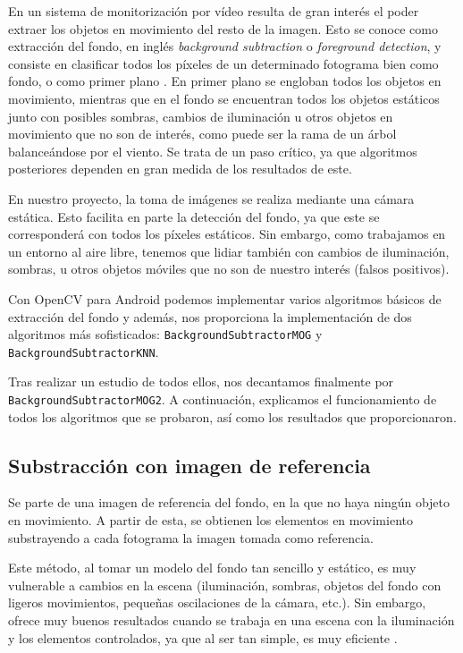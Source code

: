En un sistema de monitorización por vídeo resulta de gran interés el
poder extraer los objetos en movimiento del resto de la imagen. Esto se
conoce como extracción del fondo, en inglés \emph{background
subtraction} o \emph{foreground detection}, y consiste en clasificar
todos los píxeles de un determinado fotograma bien como fondo, o como
primer plano \citep{wiki:bs}. En primer plano se engloban todos los
objetos en movimiento, mientras que en el fondo se encuentran todos los
objetos estáticos junto con posibles sombras, cambios de iluminación u
otros objetos en movimiento que no son de interés, como puede ser la
rama de un árbol balanceándose por el viento. Se trata de un paso
crítico, ya que algoritmos posteriores dependen en gran medida de los
resultados de este.

En nuestro proyecto, la toma de imágenes se realiza mediante una cámara
estática. Esto facilita en parte la detección del fondo, ya que este se
corresponderá con todos los píxeles estáticos. Sin embargo, como
trabajamos en un entorno al aire libre, tenemos que lidiar también con
cambios de iluminación, sombras, u otros objetos móviles que no son de
nuestro interés (falsos positivos).

Con OpenCV para Android podemos implementar varios algoritmos básicos de
extracción del fondo y además, nos proporciona la implementación de dos
algoritmos más sofisticados: \texttt{BackgroundSubtractorMOG} y \\
\texttt{BackgroundSubtractorKNN}. 

Tras realizar un estudio de todos
ellos, nos decantamos finalmente por \texttt{BackgroundSubtractorMOG2}.
A continuación, explicamos el funcionamiento de todos los algoritmos que
se probaron, así como los resultados que proporcionaron.

\subsection{Substracción con imagen de referencia}\label{substraccion-con-imagen-de-referencia}

Se parte de una imagen de referencia del fondo, en la que no haya ningún
objeto en movimiento. A partir de esta, se obtienen los elementos en
movimiento substrayendo a cada fotograma la imagen tomada como
referencia.

Este método, al tomar un modelo del fondo tan sencillo y estático, es
muy vulnerable a cambios en la escena (iluminación, sombras, objetos del
fondo con ligeros movimientos, pequeñas oscilaciones de la cámara,
etc.). Sin embargo, ofrece muy buenos resultados cuando se trabaja en
una escena con la iluminación y los elementos controlados, ya que al ser
tan simple, es muy eficiente \citep{programarfacil:detmov}.


